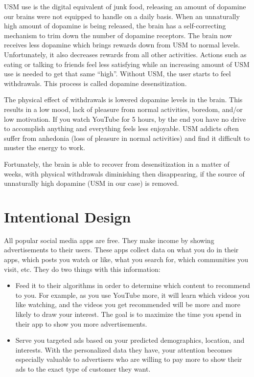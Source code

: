 \documentclass[
]{book}
\providecommand{\tightlist}{%
  \setlength{\itemsep}{0pt}\setlength{\parskip}{0pt}}
\begin{document}
USM use is the digital equivalent of junk food, releasing an amount of dopamine our brains were not equipped to handle on a daily basis. When an unnaturally high amount of dopamine is being released, the brain has a self-correcting mechanism to trim down the number of dopamine receptors. The brain now receives less dopamine which brings rewards down from USM to normal levels. Unfortunately, it also decreases rewards from all other activities. Actions such as eating or talking to friends feel less satisfying while an increasing amount of USM use is needed to get that same ``high''. Without USM, the user starts to feel withdrawals. This process is called dopamine desensitization.

The physical effect of withdrawals is lowered dopamine levels in the brain. This results in a low mood, lack of pleasure from normal activities, boredom, and/or low motivation. If you watch YouTube for 5 hours, by the end you have no drive to accomplish anything and everything feels less enjoyable. USM addicts often suffer from anhedonia (loss of pleasure in normal activities) and find it difficult to muster the energy to work.

Fortunately, the brain is able to recover from desensitization in a matter of weeks, with physical withdrawals diminishing then disappearing, if the source of unnaturally high dopamine (USM in our case) is removed.

\section{Intentional Design}\label{intentional-design}

All popular social media apps are free. They make income by showing advertisements to their users. These apps collect data on what you do in their apps, which posts you watch or like, what you search for, which communities you visit, etc. They do two things with this information:

\begin{itemize}
\tightlist
\item
  Feed it to their algorithms in order to determine which content to recommend to you. For example, as you use YouTube more, it will learn which videos you like watching, and the videos you get recommended will be more and more likely to draw your interest. The goal is to maximize the time you spend in their app to show you more advertisements.
\item
  Serve you targeted ads based on your predicted demographics, location, and interests. With the personalized data they have, your attention becomes especially valuable to advertisers who are willing to pay more to show their ads to the exact type of customer they want.
\end{itemize}
\end{document}
